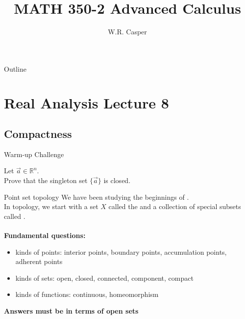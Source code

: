 \documentclass{beamer}
\title{MATH 350-2 Advanced Calculus}
\subtitle
{} %
\author[W.R. Casper] %
{W.R. Casper}
\institute[California State University Fullerton] %
{
  Department of Mathematics\\
  California State University Fullerton}
\begin{document}
\begin{frame}
  \titlepage
\end{frame}

\begin{frame}{Outline}
  \tableofcontents
\end{frame}



\section{Real Analysis Lecture 8}

\subsection{Compactness}

\begin{frame}{Warm-up Challenge}
\begin{prob}
Let $\vec a\in\mathbb{R}^n$.\\
Prove that the singleton set $\{\vec a\}$ is closed.
\end{prob}
\end{frame}

\begin{frame}{Point set topology}
We have been studying the beginnings of .\\
\pause
In topology, we start with a set $X$ called the  and a collection of special subsets called .\\\mbox{}\\
\pause
\textbf{Fundamental questions:}
\begin{itemize}
\pause
\item kinds of points: interior points, boundary points, accumulation points, adherent points
\pause
\item kinds of sets: open, closed, connected, component, compact
\pause
\item kinds of functions: continuous, homeomorphism
\end{itemize}
\pause
{\color{red}\textbf{Answers must be in terms of open sets}}
\end{frame}
\end{document}
